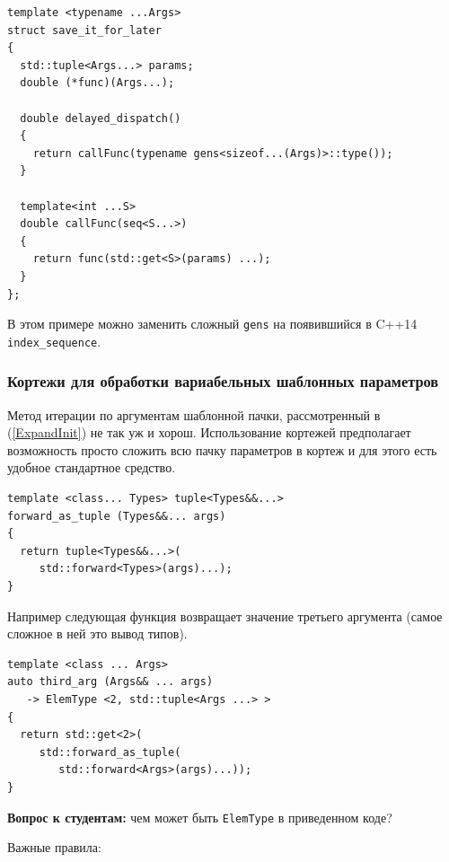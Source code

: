 \documentclass[a4paper,12pt,oneside]{article}
\newif\ifanswers
\begin{document}
\begin{lstlisting}
template <typename ...Args>
struct save_it_for_later
{
  std::tuple<Args...> params;
  double (*func)(Args...);

  double delayed_dispatch()
  {
    return callFunc(typename gens<sizeof...(Args)>::type());
  }

  template<int ...S>
  double callFunc(seq<S...>)
  {
    return func(std::get<S>(params) ...);
  }
};
\end{lstlisting}

В этом примере можно заменить сложный \lstinline!gens! на появившийся в C++14 \lstinline!index_sequence!.

\subsubsection{Кортежи для обработки вариабельных шаблонных параметров}\label{ExpandTuple}

Метод итерации по аргументам шаблонной пачки, рассмотренный в (\ref{ExpandInit}) не так уж и хорош. Использование кортежей предполагает возможность просто сложить всю пачку параметров в кортеж и для этого есть удобное стандартное средство.

\begin{lstlisting}
template <class... Types> tuple<Types&&...> 
forward_as_tuple (Types&&... args)
{
  return tuple<Types&&...>(
     std::forward<Types>(args)...);
} 
\end{lstlisting}

Например следующая функция возвращает значение третьего аргумента (самое сложное в ней это вывод типов).

\begin{lstlisting}
template <class ... Args>
auto third_arg (Args&& ... args) 
   -> ElemType <2, std::tuple<Args ...> >
{
  return std::get<2>(
     std::forward_as_tuple(
        std::forward<Args>(args)...));
}
\end{lstlisting}

\textbf{Вопрос к студентам:} чем может быть \lstinline!ElemType! в приведенном коде?

\ifanswers
\lstinline!ElemType! это просто удобный синоним для сложного выводного типа:

\begin{lstlisting}
template <size_t i, class T>
using ElemType = decltype (
   std::get<i>(std::declval<T>()));
\end{lstlisting}
\fi

Важные правила: 
\end{document}
